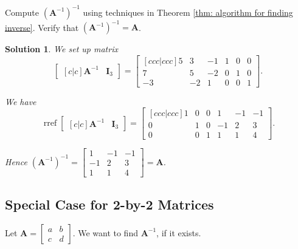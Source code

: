 \documentclass[]{book}
\DeclareMathOperator{\rref}{rref}
\newcommand{\inv}[1]{\ensuremath{{#1}^{-1}}}
\newcommand{\invm}[1]{\ensuremath{\inv{\mat{#1}}}}
\newcommand{\mat}[1]{\ensuremath{\mathbf{#1}}}
\newcommand{\idmat}[1][n]{\ensuremath{\mat{I}_#1}}
\newtheorem*{solution}{Solution}
\begin{document}
\begin{example}
    Compute $\inv{\left(\invm{A}\right)}$ using techniques in Theorem \ref{thm: algorithm for finding inverse}. Verify that $\inv{\left(\invm{A}\right)} = \mat{A}$.
\begin{solution}
    We set up matrix
    \[\begin{bmatrix}[c|c] \invm{A} & \idmat[3] \end{bmatrix} = \begin{bmatrix}[ccc|ccc]5 & 3 & -1 & 1 & 0 & 0 \\ 7 & 5 & -2 & 0 & 1 & 0 \\ -3 & -2 & 1 & 0 & 0 & 1\end{bmatrix}.\]
    
    We have
    \[\rref{\begin{bmatrix}[c|c] \invm{A} & \idmat[3] \end{bmatrix}} = \begin{bmatrix}[ccc|ccc] 1 & 0 & 0 & 1 & -1 & -1 \\ 0 & 1 & 0 & -1 & 2 & 3 \\ 0 & 0 & 1 & 1 & 1 & 4\end{bmatrix}.\]
    
    Hence $\inv{\left(\invm{A}\right)} = \begin{bmatrix} 1 & -1 & -1 \\ -1 & 2 & 3 \\ 1 & 1 & 4\end{bmatrix} = \mat{A}$. \hfill \qedsymbol
\end{solution}
\end{example}

\subsection{Special Case for 2-by-2 Matrices}
\label{section: finding inverse transformations: special case for 2x2}

Let $\mat{A} = \begin{bmatrix} a & b \\ c & d\end{bmatrix}$. We want to find $\invm{A}$, if it exists. 
\end{document}

